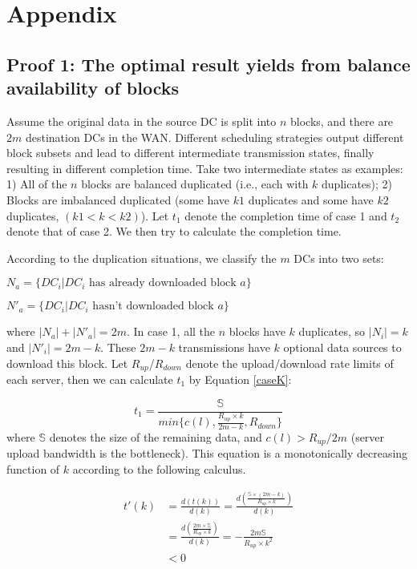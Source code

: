 \section{Appendix}
\subsection{Proof 1: The optimal result yields from balance availability of blocks}\label{appendix:balance}
Assume the original data in the source DC is split into $n$ blocks, and there are $2m$ destination DCs in the WAN. Different scheduling strategies output different block subsets and lead to different intermediate transmission states, finally resulting in different completion time. Take two intermediate states as examples: 1) All of the $n$ blocks are balanced duplicated (i.e., each with $k$ duplicates); 2) Blocks are imbalanced duplicated (some have $k1$ duplicates and some have $k2$ duplicates, $(k1<k<k2)$). Let $t_1$ denote the completion time of case 1 and $t_2$ denote that of case 2. We then try to calculate the completion time.

According to the duplication situations, we classify the $m$ DCs into two sets:

$N_a = \{DC_i|DC_i \text{ has already downloaded block $a$}\}$

$N'_a = \{DC_i|DC_i \text{ hasn't downloaded block $a$}\}$

where $|N_a| + |N'_a| = 2m$. In case 1, all the $n$ blocks have $k$ duplicates, so $|N_i| = k$ and $|N'_i| = 2m-k$. These $2m-k$ transmissions have $k$ optional data sources to download this block. Let $R_{up}$/$R_{down}$ denote the upload/download rate limits of each server, then we can calculate $t_1$ by Equation \ref{caseK}:

\begin{equation}
\label{caseK}
t_1 = \frac{\mathbb{S}}{min\{c(l),\frac{R_{up}\times k}{2m-k},R_{down}\}}
\end{equation}
where $\mathbb{S}$ denotes the size of the remaining data, and $c(l) > R_{up}/2m$ (server upload bandwidth is the bottleneck). This equation is a monotonically decreasing function of $k$ according to the following calculus.

\begin{equation}
\label{calculus}
\begin{split}
t'(k) &= \frac{d(t(k))}{d(k)} = \frac{d(\frac{\mathbb{S}\times (2m-k)}{R_{up}\times k})}{d(k)} \\
    &= \frac{d(\frac{2m\times \mathbb{S}}{R_{up}\times k})}{d(k)} = -\frac{2m\mathbb{S}}{R_{up}\times k^2} \\
    &< 0
\end{split}
\end{equation}

